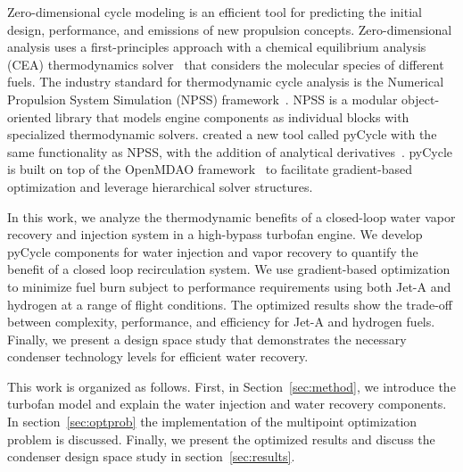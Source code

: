 \documentclass[conf]{new-aiaa}
\begin{document}
Zero-dimensional cycle modeling is an efficient tool for predicting the initial design, performance, and emissions of new propulsion concepts.
Zero-dimensional analysis uses a first-principles approach with a chemical equilibrium analysis (CEA) thermodynamics solver~\cite{Gordon1994} that considers the molecular species of different fuels.
The industry standard for thermodynamic cycle analysis is the Numerical Propulsion System Simulation (NPSS) framework~\cite{JonesNPSS}.
NPSS is a modular object-oriented library that models engine components as individual blocks with specialized thermodynamic solvers.
\citet{Hendricks2019} created a new tool called pyCycle with the same functionality as NPSS, with the addition of analytical derivatives~\cite{Gray2017b}.
pyCycle is built on top of the OpenMDAO framework~\cite{Gray2019a} to facilitate gradient-based optimization and leverage hierarchical solver structures.

In this work, we analyze the thermodynamic benefits of a closed-loop water vapor recovery and injection system in a high-bypass turbofan engine.
We develop pyCycle components for water injection and vapor recovery to quantify the benefit of a closed loop recirculation system.
We use gradient-based optimization to minimize fuel burn subject to performance requirements using both Jet-A and hydrogen at a range of flight conditions.
The optimized results show the trade-off between complexity, performance, and efficiency for Jet-A and hydrogen fuels.
Finally, we present a design space study that demonstrates the necessary condenser technology levels for efficient water recovery.

This work is organized as follows. First, in Section~\ref{sec:method}, we introduce the turbofan model and explain the water injection and water recovery components.
In section~\ref{sec:optprob} the implementation of the multipoint optimization problem is discussed.
Finally, we present the optimized results and discuss the condenser design space study in section~\ref{sec:results}.
\end{document}
